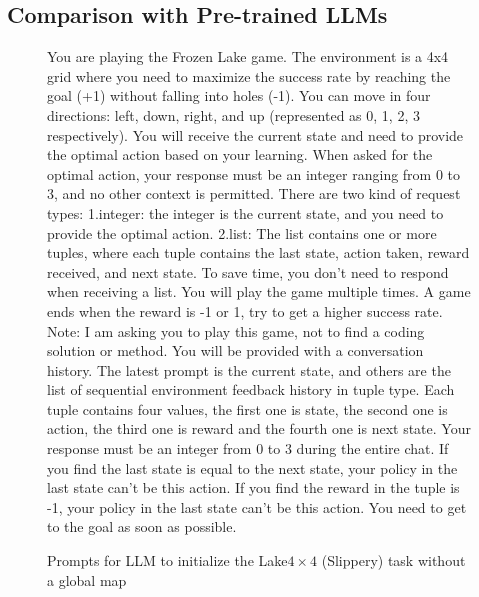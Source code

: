 \documentclass{article}
\begin{document}
\subsection{Comparison with Pre-trained LLMs}\label{sec:LLM_comparison}
\begin{figure}
\begin{mdframed}[roundcorner=10pt]
You are playing the Frozen Lake game. The environment is a 4x4 grid where you need to maximize the success rate by reaching the goal (+1) without falling into holes (-1). You can move in four directions: left, down, right, and up (represented as 0, 1, 2, 3 respectively). You will receive the current state and need to provide the optimal action based on your learning.  When asked for the optimal action, your response must be an integer ranging from 0 to 3, and no other context is permitted. There are two kind of request types:
1.integer: the integer is the current state, and you need to provide the optimal action.
2.list: The list contains one or more tuples, where each tuple contains the last state, action taken, reward received, and next state. To save time, you don't need to respond when receiving a list.
You will play the game multiple times. A game ends when the reward is -1 or 1, try to get a higher success rate.
Note: I am asking you to play this game, not to find a coding solution or method.
You will be provided with a conversation history. The latest prompt is the current state, and others are the list of sequential environment feedback history in tuple type. Each tuple contains four values, the first one is state, the second one is action, the third one is reward and the fourth one is next state.
Your response must be an integer from 0 to 3 during the entire chat.
If you find the last state is equal to the next state, your policy in the last state can't be this action.
If you find the reward in the tuple is -1, your policy in the last state can't be this action.
You need to get to the goal as soon as possible.
\end{mdframed}
\caption{Prompts for LLM to initialize the {Lake$4\times4$ (Slippery)} task without a global map}
\label{page:prompts_without_map}
\end{figure}
\end{document}
